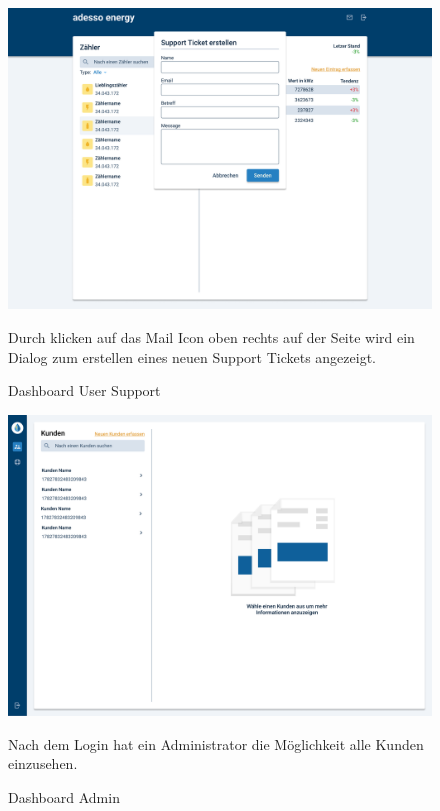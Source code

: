 \newpage

\begin{figure}[h]
	\centering
    \includegraphics[scale=0.3]{img/WebsiteMockup/Dashboard-User-Mail}
	\caption{Dashboard User Support} \hfill \break
	Durch klicken auf das Mail Icon oben rechts auf der Seite wird ein Dialog zum erstellen eines neuen Support Tickets angezeigt.
\end{figure}

\newpage

\begin{figure}[h]
	\centering
    \includegraphics[scale=0.3]{img/WebsiteMockup/Dashboard-Admin-NonSelected}
	\caption{Dashboard Admin} \hfill \break
	Nach dem Login hat ein Administrator die Möglichkeit alle Kunden einzusehen.
\end{figure}

